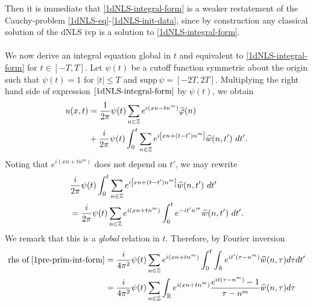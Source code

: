 %
%
Then it is immediate that \eqref{1dNLS-integral-form} is a weaker 
restatement of the Cauchy-problem \eqref{1dNLS-eq}-\eqref{1dNLS-init-data}, 
since by construction any classical solution of the dNLS 
ivp is a solution to \eqref{1dNLS-integral-form}. 
\\
\\
%
%
We now derive an integral 
equation global in $t$ and equivalent to \eqref{1dNLS-integral-form} for $t 
\in [-T, T]$. Let $\psi(t)$ be a cutoff function symmetric about the 
origin such that $\psi(t) = 1$ for $|t| \le T$ and $\text{supp} \, \psi 
= [-2T, 2T ]$. Multiplying the right hand side of expression
$\eqref{1dNLS-integral-form}$ by $\psi(t)$, we obtain
%
%
\begin{equation}
	\begin{split}
		\label{1cutoff-int-eq}
		u(x, t)
		& = \frac{1}{2 \pi} \psi(t) \sum_{n \in \mathbb{Z}} e^{i(xn - t n^m)} \widehat{\varphi}(n) 
		\\
		& + \frac{i }{2 \pi} \psi(t) \int_0^t \sum_{n \in \mathbb{Z}} 
		e^{i\left[ xn + (t - t')n^m \right]} \widehat{w}(n, t') \ dt'.
	\end{split}
\end{equation}
%
%
Noting that $e^{i\left( xn + tn^m \right)}$ 
does not depend on $t'$, we may rewrite
%
%
\begin{equation}
	\label{1pre-prim-int-form}
	\begin{split}
		& \frac{i }{2 \pi} \psi(t) \int_0^t \sum_{n \in \mathbb{Z}} 
		e^{i\left[ xn + (t - t') n^m \right]} \widehat{w}(n, t') \ dt'
		\\
		& = \frac{i}{2 \pi} \psi(t) \sum_{n \in \mathbb{Z}} e^{i\left( xn + t 
		 n^m 
		\right)} \int_0^t e^{- it'n^m} \widehat{w}(n, t') \ dt'.
	\end{split}
\end{equation}
We remark that this is a \emph{global} relation in $t$. Therefore, by Fourier 
inversion
%
%
%
%
%
%
%
\begin{equation*}
	\begin{split}
		\text{rhs of} \; \eqref{1pre-prim-int-form}
		& = \frac{i}{4 \pi^2} \psi (t) \sum_{n \in \mathbb{Z}} e^{i\left( xn + t 
		 n^m
		\right)} \int_0^t \int_{\mathbb{R}} e^{it'\left( \tau - n^m \right) }
		\widehat{w}(n, \tau) d \tau dt'
		\\
		& = \frac{i}{4 \pi^2} \psi(t) \sum_{n \in \mathbb{Z}} \int_{\mathbb{R}} 
		e^{i\left( xn + tn^m \right)} \frac{e^{it\left( \tau - n^m 
		\right)}-1}{\tau - n^m} \widehat{w}(n, \tau) d \tau
	\end{split}
\end{equation*}
